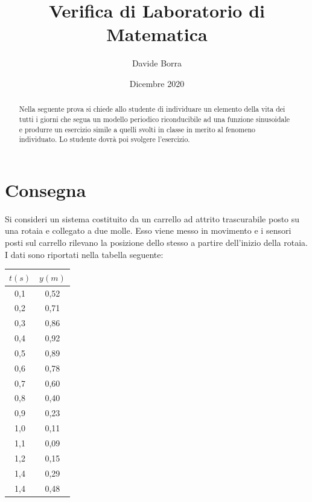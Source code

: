 \documentclass{article}     %
\title{Verifica di Laboratorio di Matematica}
\author{Davide Borra }
\date{Dicembre 2020}
\begin{document}
\maketitle
\begin{abstract}
    Nella seguente prova si chiede allo studente di individuare un elemento della vita dei tutti i giorni che segua un modello periodico riconducibile ad una funzione sinusoidale e produrre un esercizio simile a quelli svolti in classe in merito al fenomeno individuato. Lo studente dovrà poi svolgere l'esercizio.
\end{abstract}

\section*{Consegna}
    Si consideri un sistema costituito da un carrello ad attrito trascurabile posto su una rotaia e collegato a due molle. Esso viene messo in movimento e i sensori posti sul carrello rilevano la posizione dello stesso a partire dell'inizio della rotaia. I dati sono riportati nella tabella seguente:
    
    \vspace{0.2 cm}
    \begin{tabular}{|c|c|}
        \hline
        $t (s)$ & $y (m)$\\ \hline \hline
        0,1 & 0,52 \\ \hline
        0,2 & 0,71 \\ \hline
        0,3 & 0,86 \\ \hline
        0,4 & 0,92 \\ \hline
        0,5 & 0,89 \\ \hline
        0,6 & 0,78 \\ \hline
        0,7 & 0,60 \\ \hline
        0,8 & 0,40 \\ \hline
        0,9 & 0,23 \\ \hline
        1,0 & 0,11 \\ \hline
        1,1 & 0,09 \\ \hline
        1,2 & 0,15 \\ \hline
        1,4 & 0,29 \\ \hline
        1,4 & 0,48 \\ \hline
    \end{tabular}
    \vspace{0.2 cm}
    
\end{document}
